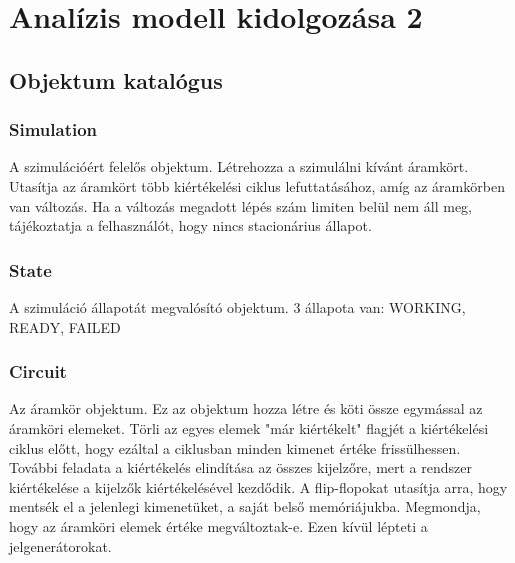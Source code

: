 %
\chapter{Analízis modell kidolgozása 2}

\thispagestyle{fancy}

\section{Objektum katalógus}

\subsection{\bf Simulation}
A szimulációért felelős objektum. Létrehozza a szimulálni kívánt áramkört. Utasítja az áramkört több kiértékelési ciklus lefuttatásához, amíg az áramkörben van változás. Ha a változás megadott lépés szám limiten belül nem áll meg, tájékoztatja a felhasználót, hogy nincs stacionárius állapot.

\subsection{\bf State}
A szimuláció állapotát megvalósító objektum. 3 állapota van: WORKING, READY, FAILED

\subsection{\bf Circuit}
Az áramkör objektum. Ez az objektum hozza létre és köti össze egymással az áramköri elemeket. Törli az egyes elemek "már kiértékelt" flagjét a kiértékelési ciklus előtt, hogy ezáltal a ciklusban minden kimenet értéke frissülhessen. További feladata a kiértékelés elindítása az összes kijelzőre, mert a rendszer kiértékelése a kijelzők kiértékelésével kezdődik. A flip-flopokat utasítja arra, hogy mentsék el a jelenlegi kimenetüket, a saját belső memóriájukba. Megmondja, hogy az áramköri elemek értéke megváltoztak-e. Ezen kívül lépteti a jelgenerátorokat.

